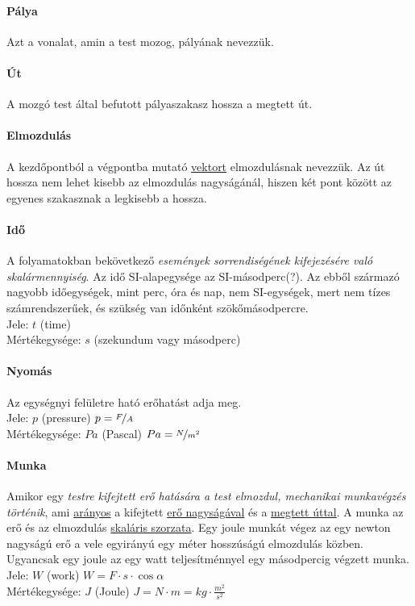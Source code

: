 \paragraph{Pálya}
Azt a vonalat, amin a test mozog, pályának nevezzük.

\paragraph{Út}
A mozgó test által befutott pályaszakasz hossza a megtett út.

\paragraph{Elmozdulás}
A kezdőpontból a végpontba mutató \underline{vektort} elmozdulásnak nevezzük.
Az út hossza nem lehet kisebb az elmozdulás nagyságánál, hiszen két pont között az egyenes szakasznak a legkisebb a hossza.

\paragraph{Idő}
A folyamatokban bekövetkező \emph{események sorrendiségének kifejezésére való skalármennyiség}. Az idő SI-alapegysége az SI-másodperc(?). Az ebből származó nagyobb időegységek, mint perc, óra és nap, nem SI-egységek, mert nem tízes számrendszerűek, és szükség van időnként szökőmásodpercre.\\
Jele: $t$ (time)\\
Mértékegysége: $s$ (szekundum vagy másodperc)

\paragraph{Nyomás}
Az egységnyi felületre ható erőhatást adja meg.\\
Jele: $p$ (pressure) \quad $p = \nicefrac{F}{A}$\\
Mértékegysége: $Pa$ (Pascal) \quad $Pa = \nicefrac{N}{m^2}$

\paragraph{Munka}
Amikor egy \emph{testre kifejtett erő hatására a test elmozdul, mechanikai munkavégzés történik}, ami \underline{arányos} a kifejtett \underline{erő nagyságával} és a \underline{megtett úttal}. A munka az erő és az elmozdulás \underline{skaláris szorzata}. Egy joule munkát végez az egy newton nagyságú erő a vele egyirányú egy méter hosszúságú elmozdulás közben. Ugyancsak egy joule az egy watt teljesítménnyel egy másodpercig végzett munka.\\
Jele: $W$ (work) \quad $W=F\cdot s \cdot \cos\alpha$\\
Mértékegysége: $J$ (Joule)	\quad $J = N \cdot m = kg \cdot \frac{m^2}{s^2}$

